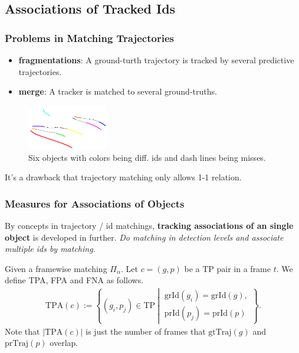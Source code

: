 \documentclass[slidetop, mathserif]{beamer}
\begin{document}
\subsection{Associations of Tracked Ids}

\begin{frame}
	\frametitle{Problems in Matching Trajectories}
	
	\begin{itemize}
		\item {\bf fragmentations}:
		      A ground-turth trajectory is tracked by
			  several predictive trajectories.
		\item {\bf merge}:
		      A tracker is matched to several ground-truths.
	\end{itemize}

	\begin{figure}
		\includegraphics[width=100pt]{pics/fig9.png}
		\caption{Six objects with colors being diff. ids and dash lines being misses.}
	\end{figure}

	\vspace{-15pt}
	It's a drawback that trajectory matching only allows 1-1 relation.
	
\end{frame}

\begin{frame}
	\frametitle{Measures for Associations of Objects}
	
	By concepts in trajectory / id matchings,
	{\bf tracking associations of an single object} is developed in further.
	\emph{Do matching in detection levels and associate multiple ids by matching.}
	
	\vspace{4pt}
	
	Given a framewise matching $\Pi_\alpha$.
	Let $c = (g,p)$ be a TP pair in a frame $t$.
	We define TPA, FPA and FNA as follows.
	\begin{align*}
		\text{TPA}(c) :=                       
		\left\{(g_i, p_j)\in\text{TP}\ \left|\ 
		\begin{array}{c}                       
		\text{grId}(g_i)=\text{grId}(g),       \\
		\text{prId}(p_j) = \text{prId}(p)      
		\end{array}\right.                     
		\right\}.                              
	\end{align*}
	Note that $|\text{TPA}(c)|$ is just the number of frames that $\text{gtTraj}(g)$
	and $\text{prTraj}(p)$ overlap.
	
\end{frame}
\end{document}
